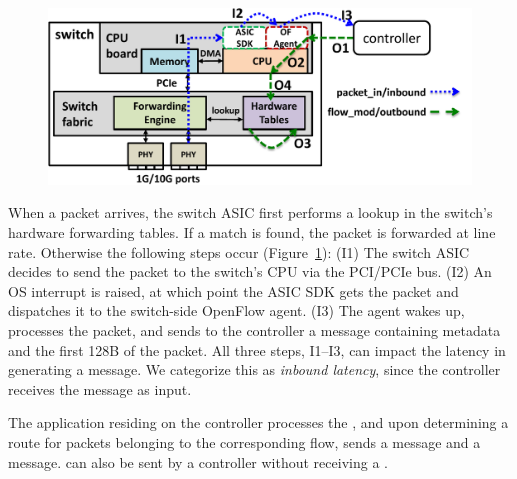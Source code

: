 
\begin{figure}
\centering
\includegraphics[width=0.98\columnwidth]{figs/openflow_switch.pdf}
\label{openflow_switch_delay}
\end{figure}

 When a packet arrives, the switch ASIC first
performs a lookup in the switch's hardware forwarding tables. If a match is
found, the packet is forwarded at line rate. Otherwise the following steps
occur (Figure~\ref{openflow_switch_delay}): (I1) The switch ASIC decides to
send the packet to the switch's CPU via the PCI/PCIe bus. (I2) An OS
interrupt is raised, at which point the ASIC SDK gets the packet and
dispatches it to the switch-side OpenFlow agent. (I3) The agent wakes up,
processes the packet, and sends to the controller a \packetin message
containing metadata and the first 128B of the packet. All three steps,
I1--I3, can impact the latency in generating a \packetin message. We
categorize this as {\em inbound latency}, since the controller receives the
message as input.

 The application residing on the controller
processes the \packetin, and upon determining a route for packets
belonging to the corresponding flow, sends a \flowmod message and a \packetout
message. \flowmod can also be sent by a controller without receiving a \packetin.

